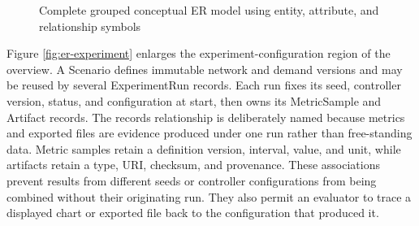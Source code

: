 \begin{figure}[htbp]
\caption{Complete grouped conceptual ER model using entity, attribute, and relationship symbols}
\label{fig:er}
\end{figure}

Figure \ref{fig:er-experiment} enlarges the experiment-configuration region of the overview. A Scenario defines immutable network and demand versions and may be reused by several ExperimentRun records. Each run fixes its seed, controller version, status, and configuration at start, then owns its MetricSample and Artifact records. The records relationship is deliberately named because metrics and exported files are evidence produced under one run rather than free-standing data. Metric samples retain a definition version, interval, value, and unit, while artifacts retain a type, URI, checksum, and provenance. These associations prevent results from different seeds or controller configurations from being combined without their originating run. They also permit an evaluator to trace a displayed chart or exported file back to the configuration that produced it.

